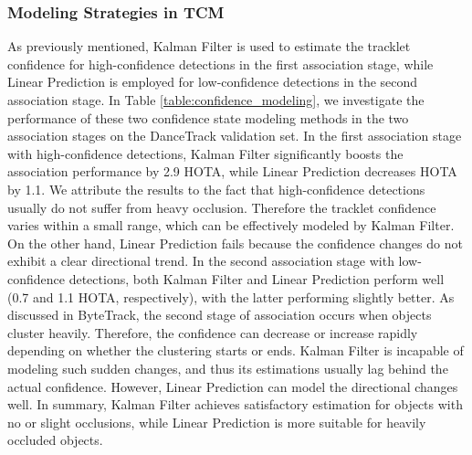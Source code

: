 \documentclass[letterpaper]{article} \usepackage{aaai23}  \usepackage{times}  \usepackage{helvet}  \usepackage{courier}  \usepackage[hyphens]{url}  \usepackage{graphicx} \urlstyle{rm} \def\UrlFont{\rm}  \usepackage{natbib}  \usepackage{caption} \frenchspacing  \setlength{\pdfpagewidth}{8.5in}  \setlength{\pdfpageheight}{11in}  \usepackage{algorithm}
\begin{document}
\subsubsection{Modeling Strategies in TCM}
As previously mentioned, Kalman Filter is used to estimate the tracklet confidence for high-confidence detections in the first association stage, while Linear Prediction is employed for low-confidence detections in the second association stage. In Table \ref{table:confidence_modeling}, we investigate the performance of these two confidence state modeling methods in the two association stages on the DanceTrack validation set. In the first association stage with high-confidence detections, Kalman Filter significantly boosts the association performance by 2.9 HOTA, while Linear Prediction decreases HOTA by 1.1. We attribute the results to the fact that high-confidence detections usually do not suffer from heavy occlusion. Therefore the tracklet confidence varies within a small range, which can be effectively modeled by Kalman Filter. On the other hand, Linear Prediction fails because the confidence changes do not exhibit a clear directional trend. In the second association stage with low-confidence detections, both Kalman Filter and Linear Prediction perform well (0.7 and 1.1 HOTA, respectively), with the latter performing slightly better. As discussed in ByteTrack, the second stage of association occurs when objects cluster heavily. Therefore, the confidence can decrease or increase rapidly depending on whether the clustering starts or ends. Kalman Filter is incapable of modeling such sudden changes, and thus its estimations usually lag behind the actual confidence. However, Linear Prediction can model the directional changes well. In summary, Kalman Filter achieves satisfactory estimation for objects with no or slight occlusions, while Linear Prediction is more suitable for heavily occluded objects.


\begin{table}
\begin{center}
\caption{Results of different confidence modeling in DanceTrack-val.}
\label{table:confidence_modeling}
\end{center}
\end{table}
\end{document}
